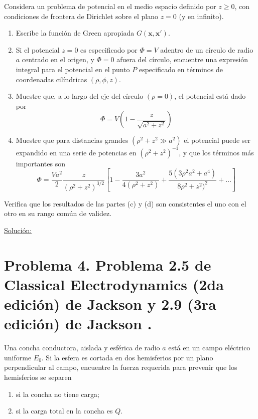 \documentclass[a4paper,10pt]{article}
\numberwithin{equation}{section}
\begin{document}
Considera un problema de potencial en el medio espacio definido por $z \geq 0$, con 
condiciones de frontera de Dirichlet sobre el plano $z = 0$ (y en infinito).

\begin{enumerate}[label=\textbf{(\alph*)}]
 \item Escribe la función de Green apropiada $G(\mathbf{x},\mathbf{x}')$.
 \item Si el potencial $z = 0$ es especificado por $\Phi = V$ adentro de un círculo 
 de radio $a$ centrado en el origen, y $\Phi = 0$ afuera del círculo, encuentre 
 una expresión integral para el potencial en el punto $P$ especificado en términos 
 de coordenadas cilíndricas $(\rho,\phi,z)$.
 \item Muestre que, a lo largo del eje del círculo $(\rho = 0)$, el potencial está 
 dado por 
 $$
 \Phi = V\left(1 - \frac{z}{\sqrt{a^2+z^2}}\right)
 $$
 \item Muestre que para distancias grandes $(\rho^2 + z^2 \gg a^2)$ el potencial 
 puede ser expandido en una serie de potencias en $(\rho^2 + z^2)^{-1}$, y que 
 los términos más importantes son 
 $$
 \Phi = \frac{Va^2}{2}\frac{z}{(\rho^2 + z^2)^{3/2}}\left[1 - 
 \frac{3a^2}{4(\rho^2 + z^2)} + \frac{5(3\rho^2a^2+a^4)}{8\rho^2 + z^2)^2} 
 + \dots \right]
 $$
\end{enumerate}

Verifica que los resultados de las partes (c) y (d) son consistentes el uno 
con el otro en su rango común de validez.

\vspace{.3cm}

\underline{Solución:} \vspace{.3cm}

\section{Problema 4. Problema 2.5 de Classical Electrodynamics (2da edición) de Jackson 
\cite{jackson2} y 2.9 (3ra edición) de Jackson \cite{jackson3}.}

Una concha conductora, aislada y esférica de radio $a$ está en un campo eléctrico 
uniforme $E_0$. Si la esfera es cortada en dos hemisferios por un plano perpendicular 
al campo, encuentre la fuerza requerida para prevenir que los hemisferios se 
separen 

\begin{enumerate}[label=\textbf{(\alph*)}]
 \item si la concha no tiene carga;
 \item si la carga total en la concha es $Q$.
\end{enumerate}
\end{document}
